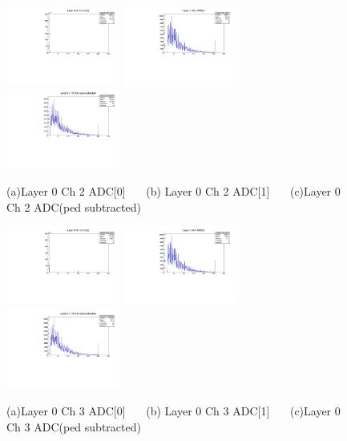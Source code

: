 \documentclass[a4paper,11pt]{article}
\theoremstyle{mytheor}
\begin{document}
\clearpage 
\begin{figure}[H] 
\vspace*{-0.3cm} 
\includegraphics[width=0.33\textwidth,scale=0.5,trim=0 0 0 0,clip]{plotsdir/file0_test-Layer0_Ch2_adc0-1.pdf} 
\includegraphics[width=0.33\textwidth,scale=0.5,trim=0 0 0 0,clip]{plotsdir/file0_test-Layer0_Ch2_adc1-1.pdf} 
\includegraphics[width=0.33\textwidth,scale=0.5,trim=0 0 0 0,clip]{plotsdir/file0_test-Layer0_Ch2_adcPedsub-1.pdf} 
\caption{(a)Layer 0 Ch 2 ADC[0] ~~~(b) Layer 0 Ch 2 ADC[1] ~~~(c)Layer 0 Ch 2 ADC(ped subtracted) } 
\end{figure} 
\begin{figure}[H] 
\vspace*{-0.3cm} 
\includegraphics[width=0.33\textwidth,scale=0.5,trim=0 0 0 0,clip]{plotsdir/file0_test-Layer0_Ch3_adc0-1.pdf} 
\includegraphics[width=0.33\textwidth,scale=0.5,trim=0 0 0 0,clip]{plotsdir/file0_test-Layer0_Ch3_adc1-1.pdf} 
\includegraphics[width=0.33\textwidth,scale=0.5,trim=0 0 0 0,clip]{plotsdir/file0_test-Layer0_Ch3_adcPedsub-1.pdf} 
\caption{(a)Layer 0 Ch 3 ADC[0] ~~~(b) Layer 0 Ch 3 ADC[1] ~~~(c)Layer 0 Ch 3 ADC(ped subtracted) } 
\end{figure} 
\end{document}
